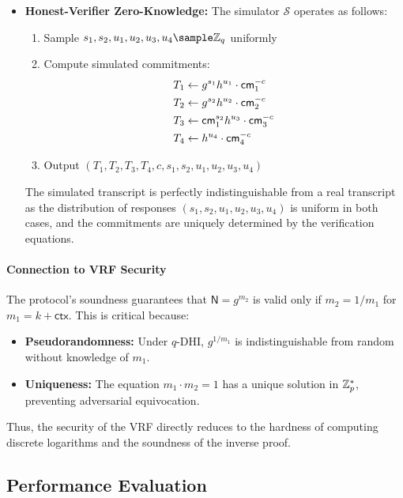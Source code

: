 \begin{itemize}
    \item \textbf{Honest-Verifier Zero-Knowledge:} The simulator $\mathcal{S}$ operates as follows:
    \begin{enumerate}
        \item Sample $s_1, s_2, u_1, u_2, u_3, u_4 \sample \Z_q$ uniformly
        \item Compute simulated commitments:
        \begin{align*}
            T_1 &\gets g^{s_1}h^{u_1} \cdot \mathsf{cm}_1^{-c}\\
            T_2 &\gets g^{s_2}h^{u_2} \cdot \mathsf{cm}_2^{-c}\\
            T_3 &\gets \mathsf{cm}_1^{s_2}h^{u_3} \cdot \mathsf{cm}_3^{-c}\\
            T_4 &\gets h^{u_4} \cdot \mathsf{cm}_4^{-c}
        \end{align*}
        \item Output $(T_1, T_2, T_3, T_4, c, s_1, s_2, u_1, u_2, u_3, u_4)$
    \end{enumerate}
    The simulated transcript is perfectly indistinguishable from a real transcript as the distribution of responses $(s_1, s_2, u_1, u_2, u_3, u_4)$ is uniform in both cases, and the commitments are uniquely determined by the verification equations.
\end{itemize}

\paragraph{Connection to VRF Security}  
The protocol’s soundness guarantees that $\textsf{N} = g^{m_2}$ is valid only if $m_2 = 1/m_1$ for $m_1 = k + \textsf{ctx}$. This is critical because:
\begin{itemize}
    \item \textbf{Pseudorandomness:} Under $q$-DHI, $g^{1/m_1}$ is indistinguishable from random without knowledge of $m_1$.
    \item \textbf{Uniqueness:} The equation $m_1 \cdot m_2 = 1$ has a unique solution in $\mathbb{Z}_p^*$, preventing adversarial equivocation.
\end{itemize}
Thus, the security of the VRF directly reduces to the hardness of computing discrete logarithms and the soundness of the inverse proof.





\subsection{Performance Evaluation}

